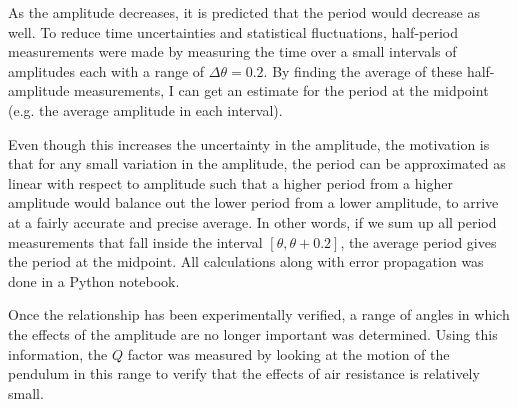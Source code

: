 \documentclass[%
 reprint,
 amsmath,amssymb
 aps,
]{revtex4-2}
\begin{document}
As the amplitude decreases, it is predicted that the period would decrease as well. To reduce time uncertainties and statistical fluctuations, half-period measurements were made by measuring the time over a small intervals of amplitudes each with a range of $\Delta \theta = 0.2$. By finding the average of these half-amplitude measurements, I can get an estimate for the period at the midpoint (e.g. the average amplitude in each interval).

Even though this increases the uncertainty in the amplitude, the motivation is that for any small variation in the amplitude, the period can be approximated as linear with respect to amplitude such that a higher period from a higher amplitude would balance out the lower period from a lower amplitude, to arrive at a fairly accurate and precise average. In other words, if we sum up all period measurements that fall inside the interval $[\theta,\theta+0.2]$, the average period gives the period at the midpoint. All calculations along with error propagation was done in a Python notebook.

Once the relationship has been experimentally verified, a range of angles in which the effects of the amplitude are no longer important was determined. Using this information, the $Q$ factor was measured by looking at the motion of the pendulum in this range to verify that the effects of air resistance is relatively small.
\end{document}
